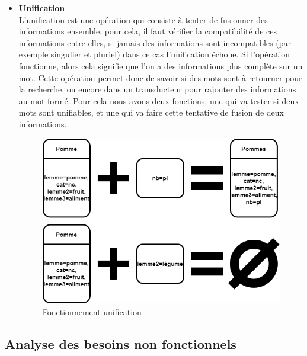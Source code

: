 \documentclass[a4paper, 12pt]{article}
\begin{document}
\begin{itemize}
\item \textbf{Unification} \\
        L'unification est une opération qui consiste à tenter de fusionner des informations ensemble, pour cela, il faut vérifier la compatibilité de ces informations entre elles, si jamais des informations sont incompatibles (par exemple singulier et pluriel) dans ce cas l'unification échoue. Si l'opération fonctionne, alors cela signifie que l'on a des informations plus complète sur un mot. Cette opération permet donc de savoir si des mots sont à retourner pour la recherche, ou encore dans un transducteur pour rajouter des informations au mot formé. Pour cela nous avons deux fonctions, une qui va tester si deux mots sont unifiables, et une qui va faire cette tentative de fusion de deux informations. 
\begin{figure}[H]
    \centerline{\includegraphics[scale=0.7]{unification.png}}
    \caption{Fonctionnement unification}
\end{figure}
        
\end{itemize}
\subsection{Analyse des besoins non fonctionnels}
\end{document}
